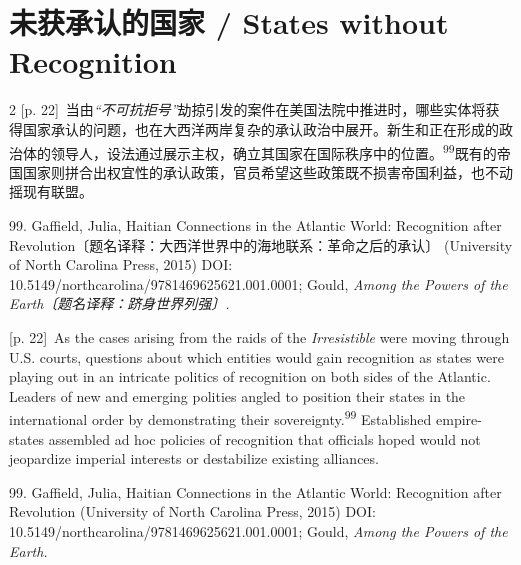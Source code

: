 \documentclass[10pt,a4paper]{article}
\begin{document}
\begin{paracol}{2}
piracy because he was carrying a commission from Artigas (Noonan, \textit{The Antelope}, 53).\par}
\switchcolumn*
\end{paracol}
\section*{未获承认的国家 / States without Recognition}
\begin{paracol}{2}
{\scriptsize\color{gray} [p. 22]}\ 当由\textit{“不可抗拒号”}劫掠引发的案件在美国法院中推进时，哪些实体将获得国家承认的问题，也在大西洋两岸复杂的承认政治中展开。新生和正在形成的政治体的领导人，设法通过展示主权，确立其国家在国际秩序中的位\mbox{置。\textsuperscript{99}}既有的帝国国家则拼合出权宜性的承认政策，官员希望这些政策既不损害帝国利益，也不动摇现有联盟。\par{\small 99. Gaffield, Julia, Haitian Connections in the Atlantic World: Recognition after Revolution〔题名译释：大西洋世界中的海地联系：革命之后的承认〕 (University of North Carolina Press, 2015) DOI: 10.5149/northcarolina/9781469625621.001.0001; Gould, \textit{Among the Powers of the Earth〔题名译释：跻身世界列强〕.}\par}
\switchcolumn
{\scriptsize\color{gray} [p. 22]}\ As the cases arising from the raids of the \textit{Irresistible} were moving through U.S. courts, questions about which entities would gain recognition as states were playing out in an intricate politics of recognition on both sides of the Atlantic. Leaders of new and emerging polities angled to position their states in the international order by demonstrating their sovereignty.\nobreak\textsuperscript{99} Established empire-states assembled ad hoc policies of recognition that officials hoped would not jeopardize imperial interests or destabilize existing alliances.\par{\small 99. Gaffield, Julia, Haitian Connections in the Atlantic World: Recognition after Revolution (University of North Carolina Press, 2015) DOI: 10.5149/northcarolina/9781469625621.001.0001; Gould, \textit{Among the Powers of the Earth.}\par}
\switchcolumn*

\end{paracol}
\end{document}
